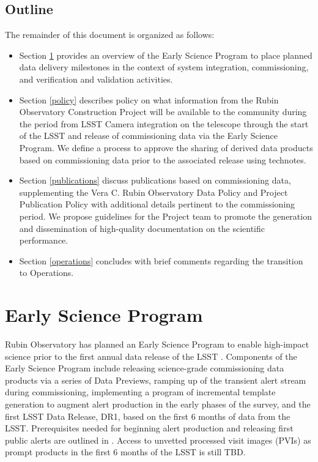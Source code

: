 \documentclass[SE,authoryear,toc]{lsstdoc}
\begin{document}
\subsection{Outline}

The remainder of this document is organized as follows:

\begin{itemize}

  \item Section \ref{early_science} provides an overview of the Early Science Program to place planned data delivery milestones in the context of system integration, commissioning, and verification and validation activities.

  \item Section \ref{policy} describes policy on what information from the Rubin Observatory Construction Project will be available to the community during the period from LSST Camera integration on the telescope through the start of the LSST and release of commissioning data via the Early Science Program.
  We define a process to approve the sharing of derived data products based on commissioning data prior to the associated release using technotes.

  \item Section \ref{publications} discuss publications based on commissioning data, supplementing the Vera C. Rubin Observatory Data Policy  and Project Publication Policy \citep{LPM-162} with additional details pertinent to the commissioning period.
  We propose guidelines for the Project team to promote the generation and dissemination of high-quality documentation on the scientific performance.

  \item Section \ref{operations} concludes with brief comments regarding the transition to Operations.

\end{itemize}

\section{Early Science Program}
\label{early_science}

Rubin Observatory has planned an Early Science Program to enable high-impact science prior to the first annual data release of the LSST .
Components of the Early Science Program include releasing science-grade commissioning data products via a series of Data Previews, ramping up of the transient alert stream during commissioning, implementing a program of incremental template generation to augment alert production in the early phases of the survey, and the first LSST Data Release, DR1, based on the first 6 months of data from the LSST.
Prerequisites needed for beginning alert production and releasing first public alerts are outlined in .
Access to unvetted processed visit images (PVIs) as prompt products in the first 6 months of the LSST is still TBD.
\end{document}
